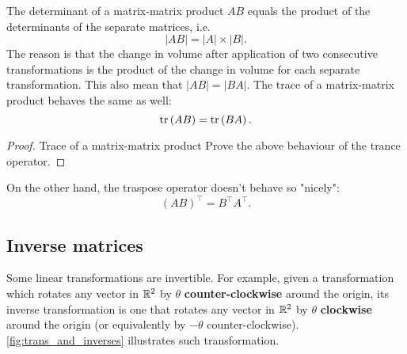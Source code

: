The determinant of a matrix-matrix product $AB$ equals the product of the determinants of the separate matrices, i.e.
\begin{equation}
	|AB| = |A|\times|B|.
	\label{eq:determinant_AB}
\end{equation}
The reason is that the change in volume after application of two consecutive transformations is the product of the change in volume for each separate transformation. This also mean that $|AB|=|BA|$. The trace of a matrix-matrix product behaves the same as well:
\begin{equation}
	\text{tr}\left(AB\right) = \text{tr}\left(BA\right).
	\label{eq:}
\end{equation}

\begin{proof}{Trace of a matrix-matrix product}{}
	Prove the above behaviour of the trance operator.
\end{proof}

On the other hand, the traspose operator doesn't behave so "nicely":
\begin{equation}
	\left(AB\right)^{\top} = B^{\top}A^{\top}.
	\label{eq:}
\end{equation}

\subsection{Inverse matrices}
Some linear transformations are invertible. For example, given a transformation which rotates any vector in $\mathbb{R}^{2}$ by $\theta$ \textbf{counter-clockwise} around the origin, its inverse transformation is one that rotates any vector in $\mathbb{R}^{2}$ by $\theta$ \textbf{clockwise} around the origin (or equivalently by $-\theta$ counter-clockwise). \autoref{fig:trans_and_inverses} illustrates such transformation.

